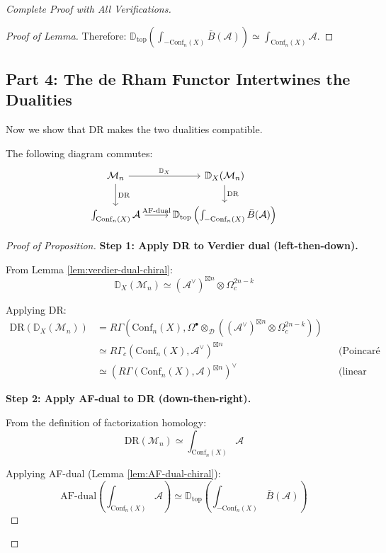 \begin{proof}[Complete Proof with All Verifications]
\begin{proof}[Proof of Lemma]
Therefore: $\mathbb{D}_{\text{top}}\left(\int_{-\text{Conf}_n(X)} \bar{B}(\mathcal{A})\right) \simeq \int_{\text{Conf}_n(X)} \mathcal{A}$. \qedhere
\end{proof}

\subsection*{Part 4: The de Rham Functor Intertwines the Dualities}

Now we show that DR makes the two dualities compatible.

\begin{proposition}\label{prop:key-compat-DR}
The following diagram commutes:
$$
\begin{tikzcd}
\mathcal{M}_n \arrow[r, "\mathbb{D}_X"] \arrow[d, "\text{DR}"] 
& \mathbb{D}_X(\mathcal{M}_n) \arrow[d, "\text{DR}"] \\
\int_{\text{Conf}_n(X)} \mathcal{A} \arrow[r, "\text{AF-dual}"] 
& \mathbb{D}_{\text{top}}\left(\int_{-\text{Conf}_n(X)} \bar{B}(\mathcal{A})\right)
\end{tikzcd}
$$
\end{proposition}

\begin{proof}[Proof of Proposition]
\textbf{Step 1: Apply DR to Verdier dual (left-then-down).}

From Lemma \ref{lem:verdier-dual-chiral}:
$$\mathbb{D}_X(\mathcal{M}_n) \simeq (\mathcal{A}^\vee)^{\boxtimes n} \otimes \Omega^{2n-k}_c$$

Applying DR:
\begin{align*}
\text{DR}(\mathbb{D}_X(\mathcal{M}_n)) 
&= R\Gamma(\text{Conf}_n(X), \Omega^\bullet \otimes_{\mathcal{D}} ((\mathcal{A}^\vee)^{\boxtimes n} \otimes \Omega^{2n-k}_c)) \\
&\simeq R\Gamma_c(\text{Conf}_n(X), \mathcal{A}^\vee)^{\boxtimes n} && \text{(Poincaré duality)} \\
&\simeq \left(R\Gamma(\text{Conf}_n(X), \mathcal{A})^{\boxtimes n}\right)^\vee && \text{(linear duality)}
\end{align*}

\textbf{Step 2: Apply AF-dual to DR (down-then-right).}

From the definition of factorization homology:
$$\text{DR}(\mathcal{M}_n) \simeq \int_{\text{Conf}_n(X)} \mathcal{A}$$

Applying AF-dual (Lemma \ref{lem:AF-dual-chiral}):
$$\text{AF-dual}\left(\int_{\text{Conf}_n(X)} \mathcal{A}\right) \simeq \mathbb{D}_{\text{top}}\left(\int_{-\text{Conf}_n(X)} \bar{B}(\mathcal{A})\right)$$


\end{proof}
\end{proof}

